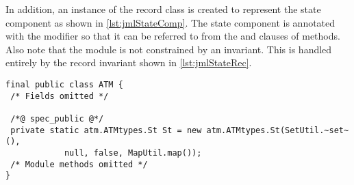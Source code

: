 In addition, an instance of the record class is created to represent
the state component as shown in \autoref{lst:jmlStateComp}. The state
component is annotated with the  modifier so that it
can be referred to from the  and  clauses of
 methods. Also note that the module is not constrained by
an invariant. This is handled entirely by the record invariant shown
in \autoref{lst:jmlStateRec}.

\begin{lstlisting}[style=customJml,caption={The state component in the
\texttt{ATM} module.},label={lst:jmlStateComp}]
final public class ATM {
 /* Fields omitted */

 /*@ spec_public @*/
 private static atm.ATMtypes.St St = new atm.ATMtypes.St(SetUtil.~set~(),
            null, false, MapUtil.map());
 /* Module methods omitted */ 
}
\end{lstlisting}


